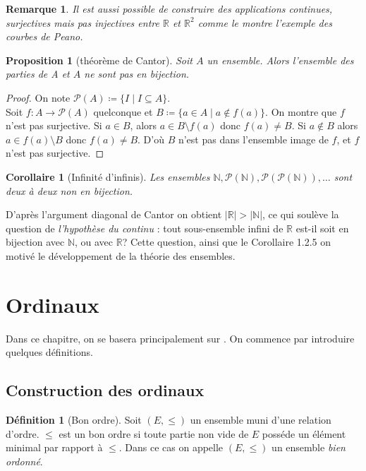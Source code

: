 \documentclass{article}
\theoremstyle{definition}
\newtheorem{definition}[subsubsection]{Définition}
\theoremstyle{plain}
\newtheorem{proposition}[subsubsection]{Proposition}
\theoremstyle{plain}
\newtheorem{corollary}[subsubsection]{Corollaire}
\theoremstyle{plain}
\theoremstyle{plain}
\newtheorem{remark}[subsubsection]{Remarque}
\begin{document}
\begin{remark}
	Il est aussi possible de construire des applications continues, surjectives mais pas injectives entre \( \mathbb{R} \) et \( \mathbb{R}^{2} \) comme le montre l'exemple des courbes de Peano. \cite{peano1890curve}
\end{remark}
\begin{proposition}[théorème de Cantor]
	Soit \( A \) un ensemble. Alors l'ensemble des parties de A et \( A \) ne sont pas en bijection.
\end{proposition} 
\begin{proof}
	On note \( \mathcal{P}(A) \coloneqq \{ I \mid I \subseteq A \}\). \\
	Soit \( f : A \rightarrow \mathcal{P}(A) \) quelconque et \( B \coloneqq \{ a \in A \mid a \not\in f(a)\} \). On montre que \( f \) n'est pas surjective. Si \( a \in B \), alors \( a \in B \setminus f(a) \) donc \( f(a) \neq B \). Si \( a \not\in B\) alors \( a \in f(a) \setminus B \) donc \( f(a) \neq B \). D'où \( B \) n'est pas dans l'ensemble image de \( f \), et \( f \) n'est pas surjective.
\end{proof}
\begin{corollary}[Infinité d'infinis]
	Les ensembles \( \mathbb{N}, \mathcal{P}(\mathbb{N}), \mathcal{P}(\mathcal{P}(\mathbb{N})), \ldots \) sont deux à deux non en bijection.
\end{corollary}

D'après l'argument diagonal de Cantor on obtient \( |\mathbb{R}| > |\mathbb{N}| \), ce qui soulève la question de \textit{l'hypothèse du continu} : tout sous-ensemble infini de \( \mathbb{R} \) est-il soit en bijection avec \( \mathbb{N} \), ou avec \( \mathbb{R} \)? Cette question, ainsi que le Corollaire 1.2.5 on motivé le développement de la théorie des ensembles.

\clearpage
\section{Ordinaux}

Dans ce chapitre, on se basera principalement sur \cite{dehornoy2017théorie}.
On commence par introduire quelques définitions.
\subsection{Construction des ordinaux} 

\begin{definition}[Bon ordre]
	Soit \( (E,\le) \) un ensemble muni d'une relation d'ordre. \( \le \) est un bon ordre si toute partie non vide de \( E \) posséde un élément minimal par rapport à \( \le \). Dans ce cas on appelle \( (E,\le) \) un ensemble \textit{bien ordonné}.	
\end{definition}
\end{document}
